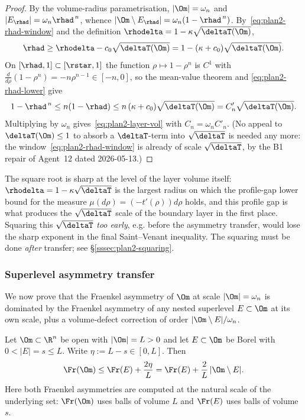 \begin{proof}
By the volume-radius parametrisation,
$|\Om|=\omega_n$ and $|E_{\rhad}|=\omega_n\rhad^{\,n}$, whence
$|\Om\setminus E_{\rhad}|=\omega_n(1-\rhad^{\,n})$.
By~\eqref{eq:plan2-rhad-window} and the definition
$\rhodelta=1-\kappa\sqrt{\deltaT(\Om)}$,
\begin{equation}\label{eq:plan2-rhad-lower}
   \rhad\ge \rhodelta-c_0\sqrt{\deltaT(\Om)}
   =1-(\kappa+c_0)\sqrt{\deltaT(\Om)}.
\end{equation}
On $[\rhad,1]\subset[\rstar,1]$ the function $\rho\mapsto 1-\rho^n$
is $C^1$ with $\frac{d}{d\rho}(1-\rho^n)=-n\rho^{n-1}\in[-n,0]$, so
the mean-value theorem and \eqref{eq:plan2-rhad-lower} give
\[
   1-\rhad^{\,n}
   \le n(1-\rhad)
   \le n\,(\kappa+c_0)\sqrt{\deltaT(\Om)}
   =C'_n\sqrt{\deltaT(\Om)}.
\]
Multiplying by $\omega_n$ gives~\eqref{eq:plan2-layer-vol} with
$C_n=\omega_n C'_n$. (No appeal to $\deltaT(\Om)\le 1$ to absorb a
$\deltaT$-term into $\sqrt{\deltaT}$ is needed any more: the
window~\eqref{eq:plan2-rhad-window} is already of scale
$\sqrt{\deltaT}$, by the B1 repair of Agent~12 dated 2026-05-13.)
\end{proof}

\begin{remark}
\label{rem:plan2-why-sqrt}
The square root is sharp at the level of the layer volume itself:
$\rhodelta=1-\kappa\sqrt{\deltaT}$ is the largest radius on which the
profile-gap lower bound for the measure $\mu(d\rho)=(-t'(\rho))d\rho$
holds, and this profile gap is what produces the $\sqrt{\deltaT}$
scale of the boundary layer in the first place. Squaring this
$\sqrt{\deltaT}$ \emph{too early}, e.g. before the asymmetry transfer,
would lose the sharp exponent in the final Saint--Venant inequality.
The squaring must be done \emph{after} transfer; see
\S\ref{sssec:plan2-squaring}.
\end{remark}

\subsubsection{Superlevel asymmetry transfer}
\label{sssec:plan2-superlevel}

We now prove that the Fraenkel asymmetry of $\Om$ at scale
$|\Om|=\omega_n$ is dominated by the Fraenkel asymmetry of any nested
superlevel $E\subset\Om$ at its own scale, plus a volume-defect
correction of order $|\Om\setminus E|/\omega_n$.

\begin{lemma}
\label{lem:plan2-superlevel}
Let $\Om\subset\R^n$ be open with $|\Om|=L>0$ and let $E\subset\Om$ be
Borel with $0<|E|=s\le L$. Write $\eta:=L-s\in[0,L]$. Then
\begin{equation}\label{eq:plan2-superlevel}
   \Fr(\Om)\le \Fr(E)+\frac{2\eta}{L}
   = \Fr(E)+\frac{2}{L}\,|\Om\setminus E|.
\end{equation}
Here both Fraenkel asymmetries are computed at the natural scale of
the underlying set: $\Fr(\Om)$ uses balls of volume $L$ and $\Fr(E)$
uses balls of volume $s$.
\end{lemma}

